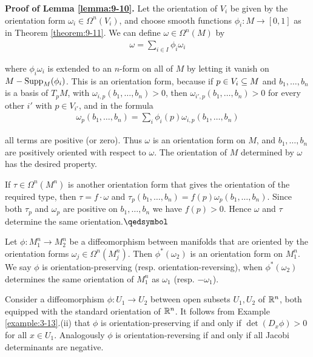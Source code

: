 \textbf{Proof of Lemma \ref{lemma:9-10}.} Let the orientation of $V_i$ be given by the orientation 
form $\omega_i\in\Omega^n(V_i)$, and choose smooth functions $\phi_i:M\to [0, 1]$ as in Theorem \ref{theorem:9-11}.
We can define $\omega\in\Omega^n(M)$ by
\begin{align*}
  \omega = \sum_{i\in I}^{}{\phi_i\omega_i}
\end{align*}

where $\phi_i\omega_i$ is extended to an $n$-form on all of $M$ by letting it vanish on
$M-\mathrm{Supp}_M(\phi_i)$. This is an orientation form, because if $p\in V_i\subseteq M$ and
$b_1, \ldots, b_n$ is a basis of $T_pM$, with $\omega_{i,p}(b_1, \ldots ,b_n) > 0$, then 
$\omega_{i',p}(b_1, \ldots ,b_n)>0$ for every other $i\prime$ with $p\in V_{i\prime}$, and in the formula
\begin{align*}
  \omega_p(b_1, \ldots ,b_n)
  = \sum_{i}^{}{\phi_i(p)\omega_{i,p}(b_1, \ldots ,b_n)}
\end{align*}

all terms are positive (or zero). Thus $\omega$ is an orientation form on $M$, and $b_1, \ldots, b_n$
are positively oriented with respect to $\omega$. The orientation of $M$ determined by
$\omega$ has the desired property.

If $\tau\in\Omega^n(M^n)$ is another orientation form that gives the orientation of the required
type, then $\tau=f\cdot \omega$ and $\tau_p(b_1, \ldots, b_n) = f(p)\omega_p(b_1, \ldots , b_n)$. 
Since both $\tau_p$ and $\omega_p$ are positive on $b_1, \ldots, b_n$ we have $f(p) > 0$. Hence $\omega$ 
and $\tau$ determine the same orientation.\hfill\(\qedsymbol\)

\begin{definition}\label{definition:9-12}
  Let $\phi:M_1^n\to M_2^n$ be a diffeomorphism between manifolds that
  are oriented by the orientation forms $\omega_j\in\Omega^n(M_j^n)$. Then $\phi^*(\omega_2)$ 
  is an orientation form on $M_1^n$. We say $\phi$ is orientation-preserving (resp. orientation-reversing),
  when $\phi^*(\omega_2)$ determines the same orientation of $M_1^n$ as $\omega_1$ (resp. $-\omega_1$).
\end{definition}

\begin{example}\label{example:9-13}
  Consider a diffeomorphism $\phi:U_1\to U_2$ between open subsets
$U_1, U_2$ of ${\mathbb{R}}^n$, both equipped with the standard orientation of ${\mathbb{R}}^n$. It 
follows from Example \ref{example:3-13}.(ii) that $\phi$ is orientation-preserving if and only if $\det(D_x\phi) > 0$
for all $x\in U_1$. Analogously $\phi$ is orientation-reversing if and only if all Jacobi
determinants are negative.
\end{example}

